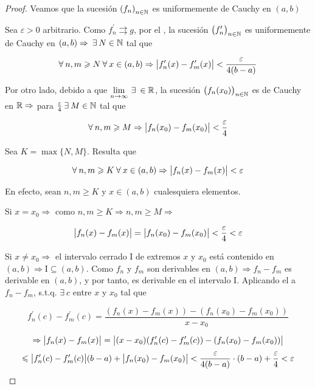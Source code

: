 \begin{proof}
    Veamos que la sucesión ${\left(f_n\right)}_{n \in \mathbb{N}}$ es uniformemente de Cauchy en $(a,b)$

    Sea $\varepsilon > 0$ arbitrario. Como ${f}^{\prime}_{n} \rightrightarrows g$, por el , la sucesión ${\left({f}^{\prime}_{n}\right)}_{n \in \mathbb{N}}$ es uniformemente de Cauchy en $(a,b) \Rightarrow \: \exists \: N \in \mathbb{N}$ tal que

    $$\forall \: n,m \geqslant N \: \forall \: x \in (a,b) \Rightarrow \abs{{f}^{\prime}_{n}(x)-{f}^{\prime}_{m}(x)} < \frac{\varepsilon}{4(b-a)}$$

    Por otro lado, debido a que $\lim\limits_{n \to \infty} \: \exists \: \in \R$, la sucesión  ${\left(f_n(x_0) \right)}_{n \in \mathbb{N}}$ es de Cauchy en $\mathbb{R} \Rightarrow$ para $\frac{\varepsilon}{4} \: \exists \: M \in \mathbb{N}$ tal que

    $$\forall \: n, m \geqslant M \Rightarrow \abs{f_n(x_0) - f_m(x_0)} < \frac{\varepsilon}{4}$$

    Sea $K = \max \{ N, M \}$. Resulta que

    $$\forall \: n, m \geqslant K \: \forall \: x \in (a,b) \Rightarrow \abs{f_n(x)-f_m(x)} < \varepsilon$$

    En efecto, sean $n, m\geqslant K$ y $x \in (a,b)$ cualesquiera elementos. 

    Si $x = x_0 \Rightarrow$ como $n, m \geqslant K \Rightarrow n, m \geqslant M \Rightarrow$

    $$\abs{f_n(x) - f_m(x)} = \abs{f_n(x_0) - f_m(x_0)} < \frac{\varepsilon}{4} < \varepsilon$$

    Si $x \neq x_0 \Rightarrow$ el intervalo cerrado $\mathrm{I}$ de extremos $x$ y $x_0$ está contenido en $(a,b) \Rightarrow \mathrm{I} \subseteq (a,b)$. Como $f_n$ y $f_m$ son derivables en $(a,b) \Rightarrow f_n - f_m$ es derivable en $(a,b)$, y por tanto, es derivable en el intervalo $\mathrm{I}$. Aplicando el  a $f_n - f_m$, s.t.q. $\exists \: c $ entre $x$ y $x_0$ tal que

    $${f}^{\prime}_{n}(c)-{f}^{\prime}_{m}(c) = \frac{(f_n(x)-f_m(x))-(f_n(x_0)-f_m(x_0))}{x-x_0}$$

    $$\Rightarrow \abs{f_n(x) - f_m(x)} = \abs{(x-x_0)({f}^{\prime}_{n}(c)-{f}^{\prime}_{m}(c))- (f_n(x_0)-f_m(x_0))}$$
    $$\leqslant \abs{{f}^{\prime}_{n}(c)-{f}^{\prime}_{m}(c)} (b-a) + \abs{f_n(x_0)-f_m(x_0)} < \frac{\varepsilon}{4(b-a)} \cdot (b-a) + \frac{\varepsilon}{4} < \varepsilon$$


\end{proof}
